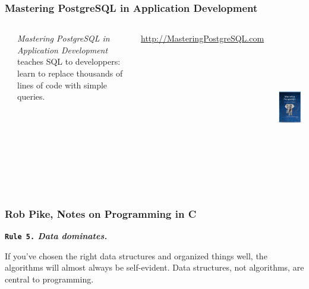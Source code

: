 \documentclass[xcolor=dvipsnames]{beamer}
\begin{document}
\begin{frame}
  \frametitle{Mastering PostgreSQL in Application Development}

  \begin{columns}[c]
    \begin{minipage}[t][12em][t]{\textwidth}
      \begin{center}
        {}
      \end{center}
      
      \vfill
      
      \textit{Mastering PostgreSQL in Application Development} teaches SQL
      to developpers: learn to replace thousands of lines of code with
      simple queries.

      \vfill
      \url{http://MasteringPostgreSQL.com}
    \end{minipage}

    \begin{center}
      \href{http://MasteringPostgreSQL.com}
           {\includegraphics[height=18em]{MasteringPostgreSQLinAppDev-Cover.png}}
    \end{center}
  \end{columns}
\end{frame}

{
 
  \begin{frame}
    \frametitle{Rob Pike, Notes on Programming in C}

    \begin{center}
      \textbf{\Large \texttt{Rule 5.} \textit{Data dominates.}}
    \end{center}

    \vfill

    \begin{displayquote}[Brooks p. 102.]
     \LARGE If you've chosen the right data structures and organized things
     well, the algorithms will almost always be self-evident. Data
     structures, not algorithms, are central to programming.
    \end{displayquote}

    \vfill
  \end{frame}
}
\end{document}
